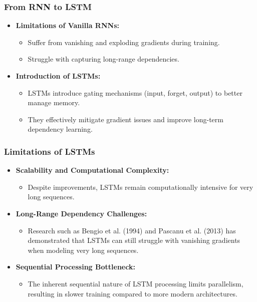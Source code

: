 \documentclass{beamer}
\begin{document}
\begin{frame}
\frametitle{From RNN to LSTM}
\begin{itemize}
    \item \textbf{Limitations of Vanilla RNNs:}
    \begin{itemize}
        \item Suffer from vanishing and exploding gradients during training.
        \item Struggle with capturing long-range dependencies.
    \end{itemize}
    \item \textbf{Introduction of LSTMs:}
    \begin{itemize}
        \item LSTMs introduce gating mechanisms (input, forget, output) to better manage memory.
        \item They effectively mitigate gradient issues and improve long-term dependency learning.
    \end{itemize}
\end{itemize}
\end{frame}

\begin{frame}
\frametitle{Limitations of LSTMs}
\begin{itemize}
    \item \textbf{Scalability and Computational Complexity:}
    \begin{itemize}
        \item Despite improvements, LSTMs remain computationally intensive for very long sequences.
    \end{itemize}
    \item \textbf{Long-Range Dependency Challenges:}
    \begin{itemize}
        \item Research such as Bengio et al. (1994) and Pascanu et al. (2013) has demonstrated that LSTMs can still struggle with vanishing gradients when modeling very long sequences.
    \end{itemize}
    \item \textbf{Sequential Processing Bottleneck:}
    \begin{itemize}
        \item The inherent sequential nature of LSTM processing limits parallelism, resulting in slower training compared to more modern architectures.
    \end{itemize}
\end{itemize}
\end{frame}
\end{document}
